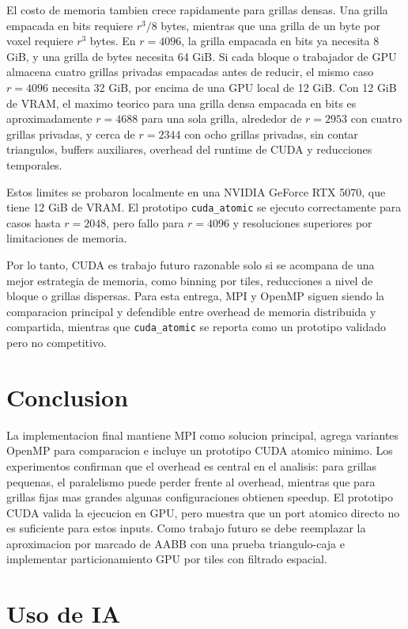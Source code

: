 \documentclass[conference]{IEEEtran}
\begin{document}
El costo de memoria tambien crece rapidamente para grillas densas. Una grilla
empacada en bits requiere $r^3/8$ bytes, mientras que una grilla de un byte por
voxel requiere $r^3$ bytes. En $r=4096$, la grilla empacada en bits ya necesita
8 GiB, y una grilla de bytes necesita 64 GiB. Si cada bloque o trabajador de GPU
almacena cuatro grillas privadas empacadas antes de reducir, el mismo caso
$r=4096$ necesita 32 GiB, por encima de una GPU local de 12 GiB. Con 12 GiB de
VRAM, el maximo teorico para una grilla densa empacada en bits es
aproximadamente $r=4688$ para una sola grilla, alrededor de $r=2953$ con cuatro
grillas privadas, y cerca de $r=2344$ con ocho grillas privadas, sin contar
triangulos, buffers auxiliares, overhead del runtime de CUDA y reducciones
temporales.

Estos limites se probaron localmente en una NVIDIA GeForce RTX 5070, que tiene
12 GiB de VRAM. El prototipo \texttt{cuda\_atomic} se ejecuto correctamente para
casos hasta $r=2048$, pero fallo para $r=4096$ y resoluciones superiores por
limitaciones de memoria.

Por lo tanto, CUDA es trabajo futuro razonable solo si se acompana de una mejor
estrategia de memoria, como binning por tiles, reducciones a nivel de bloque o
grillas dispersas. Para esta entrega, MPI y OpenMP siguen siendo la comparacion
principal y defendible entre overhead de memoria distribuida y compartida,
mientras que \texttt{cuda\_atomic} se reporta como un prototipo validado pero no
competitivo.

\section{Conclusion}

La implementacion final mantiene MPI como solucion principal, agrega variantes
OpenMP para comparacion e incluye un prototipo CUDA atomico minimo. Los
experimentos confirman que el overhead es central en el analisis: para grillas
pequenas, el paralelismo puede perder frente al overhead, mientras que para
grillas fijas mas grandes algunas configuraciones obtienen speedup. El prototipo
CUDA valida la ejecucion en GPU, pero muestra que un port atomico directo no es
suficiente para estos inputs. Como trabajo futuro se debe reemplazar la
aproximacion por marcado de AABB con una prueba triangulo-caja e implementar
particionamiento GPU por tiles con filtrado espacial.

\section*{Uso de IA}
\end{document}
